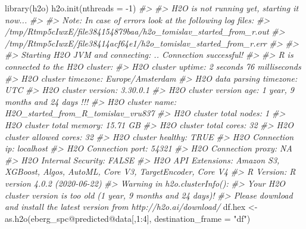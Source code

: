 \documentclass[
  graybox,natbib,nospthms]{svmono}
\newenvironment{Shaded}{\begin{snugshade}}{\end{snugshade}}
\newcommand{\AttributeTok}[1]{\textcolor[rgb]{0.61,0.61,0.61}{#1}}
\newcommand{\CommentTok}[1]{\textcolor[rgb]{0.37,0.37,0.37}{\textit{#1}}}
\newcommand{\DecValTok}[1]{\textcolor[rgb]{0.06,0.06,0.06}{#1}}
\newcommand{\FunctionTok}[1]{\textcolor[rgb]{0,0,0}{#1}}
\newcommand{\NormalTok}[1]{#1}
\newcommand{\OtherTok}[1]{\textcolor[rgb]{0.37,0.37,0.37}{#1}}
\newcommand{\SpecialCharTok}[1]{\textcolor[rgb]{0,0,0}{#1}}
\newcommand{\StringTok}[1]{\textcolor[rgb]{0.5,0.5,0.5}{#1}}
\begin{document}
\begin{Shaded}
\begin{Highlighting}[]
\FunctionTok{library}\NormalTok{(h2o)}
\FunctionTok{h2o.init}\NormalTok{(}\AttributeTok{nthreads =} \SpecialCharTok{{-}}\DecValTok{1}\NormalTok{)}
\CommentTok{\#\textgreater{} }
\CommentTok{\#\textgreater{} H2O is not running yet, starting it now...}
\CommentTok{\#\textgreater{} }
\CommentTok{\#\textgreater{} Note:  In case of errors look at the following log files:}
\CommentTok{\#\textgreater{}     /tmp/Rtmp5cIwxE/file384154879baa/h2o\_tomislav\_started\_from\_r.out}
\CommentTok{\#\textgreater{}     /tmp/Rtmp5cIwxE/file38414acf64e1/h2o\_tomislav\_started\_from\_r.err}
\CommentTok{\#\textgreater{} }
\CommentTok{\#\textgreater{} }
\CommentTok{\#\textgreater{} Starting H2O JVM and connecting: .. Connection successful!}
\CommentTok{\#\textgreater{} }
\CommentTok{\#\textgreater{} R is connected to the H2O cluster: }
\CommentTok{\#\textgreater{}     H2O cluster uptime:         2 seconds 76 milliseconds }
\CommentTok{\#\textgreater{}     H2O cluster timezone:       Europe/Amsterdam }
\CommentTok{\#\textgreater{}     H2O data parsing timezone:  UTC }
\CommentTok{\#\textgreater{}     H2O cluster version:        3.30.0.1 }
\CommentTok{\#\textgreater{}     H2O cluster version age:    1 year, 9 months and 24 days !!! }
\CommentTok{\#\textgreater{}     H2O cluster name:           H2O\_started\_from\_R\_tomislav\_vru837 }
\CommentTok{\#\textgreater{}     H2O cluster total nodes:    1 }
\CommentTok{\#\textgreater{}     H2O cluster total memory:   15.71 GB }
\CommentTok{\#\textgreater{}     H2O cluster total cores:    32 }
\CommentTok{\#\textgreater{}     H2O cluster allowed cores:  32 }
\CommentTok{\#\textgreater{}     H2O cluster healthy:        TRUE }
\CommentTok{\#\textgreater{}     H2O Connection ip:          localhost }
\CommentTok{\#\textgreater{}     H2O Connection port:        54321 }
\CommentTok{\#\textgreater{}     H2O Connection proxy:       NA }
\CommentTok{\#\textgreater{}     H2O Internal Security:      FALSE }
\CommentTok{\#\textgreater{}     H2O API Extensions:         Amazon S3, XGBoost, Algos, AutoML, Core V3, TargetEncoder, Core V4 }
\CommentTok{\#\textgreater{}     R Version:                  R version 4.0.2 (2020{-}06{-}22)}
\CommentTok{\#\textgreater{} Warning in h2o.clusterInfo(): }
\CommentTok{\#\textgreater{} Your H2O cluster version is too old (1 year, 9 months and 24 days)!}
\CommentTok{\#\textgreater{} Please download and install the latest version from http://h2o.ai/download/}
\NormalTok{df.hex }\OtherTok{\textless{}{-}} \FunctionTok{as.h2o}\NormalTok{(eberg\_spc}\SpecialCharTok{@}\NormalTok{predicted}\SpecialCharTok{@}\NormalTok{data[,}\DecValTok{1}\SpecialCharTok{:}\DecValTok{4}\NormalTok{], }\AttributeTok{destination\_frame =} \StringTok{"df"}\NormalTok{)}

\end{Highlighting}
\end{Shaded}
\end{document}
